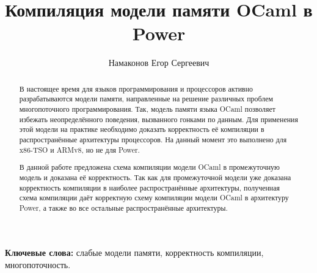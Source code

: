 



% 

\title{Компиляция модели памяти OCaml в Power}

\author{Намаконов Егор Сергеевич}



\maketitle


\begin{abstract}
  В настоящее время для языков программирования и процессоров активно разрабатываются модели памяти, направленные на решение различных проблем многопоточного программирования.
  Так, модель памяти языка OCaml  позволяет избежать неопределённого поведения, вызванного гонками по данным.
  Для применения этой модели на практике необходимо доказать корректность её компиляции в распространённые архитектуры процессоров. На данный момент это выполнено для x86-TSO и ARMv8, но не для Power.

  В данной работе предложена схема компиляции модели OCaml в промежуточную модель и доказана её корректность.
  Так как для промежуточной модели уже доказана корректность компиляции в наиболее распространённые архитектуры, полученная схема компиляции даёт корректную схему компиляции модели OCaml в архитектуру Power, а также во все остальные распространённые архитектуры.
\end{abstract}
{\bf Ключевые слова:} слабые модели памяти, корректность компиляции, многопоточность.

